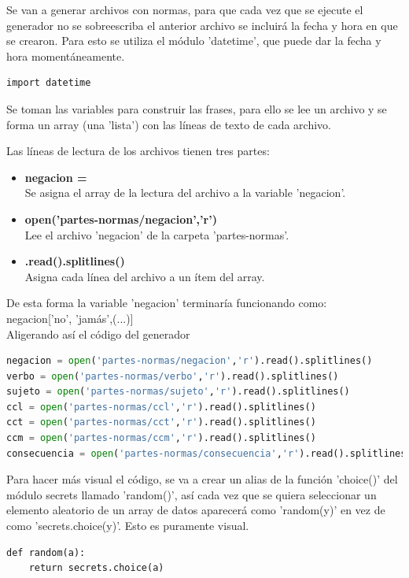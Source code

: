 \documentclass[12pt,twocolumn]{article}
\begin{document}
Se van a generar archivos con normas, para que cada vez que se ejecute el generador
no se sobreescriba el anterior archivo se incluirá la fecha y hora en que se crearon.
Para esto se utiliza el módulo 'datetime', que puede dar la fecha y hora momentáneamente.
\begin{lstlisting}[texcl=true]
import datetime
\end{lstlisting}

Se toman las variables para construir las frases, para ello se lee un archivo y
se forma un array (una 'lista') con las líneas de texto de cada archivo.

Las líneas de lectura de los archivos tienen tres partes:
	\begin{itemize}
	\setlength\itemsep{-0.3em}
    \item \textbf{negacion =} \\
    Se asigna el array de la lectura del archivo a la variable 'negacion'.
    \item \textbf{open('partes-normas/negacion','r')} \\
    Lee el archivo 'negacion' de la carpeta 'partes-normas'.
    \item \textbf{.read().splitlines()} \\
    Asigna cada línea del archivo a un ítem del array.
	\end{itemize}
De esta forma la variable 'negacion' terminaría funcionando como:\\


negacion['no', 'jamás',(...)]\\


	
Aligerando así el código del generador

\begin{lstlisting}[language=python]
negacion = open('partes-normas/negacion','r').read().splitlines()
verbo = open('partes-normas/verbo','r').read().splitlines()
sujeto = open('partes-normas/sujeto','r').read().splitlines()
ccl = open('partes-normas/ccl','r').read().splitlines()
cct = open('partes-normas/cct','r').read().splitlines()
ccm = open('partes-normas/ccm','r').read().splitlines()
consecuencia = open('partes-normas/consecuencia','r').read().splitlines()
\end{lstlisting}

Para hacer más visual el código, se va a crear un alias de la función 'choice()'
del módulo secrets llamado 'random()', así cada vez que se quiera seleccionar un
elemento aleatorio de un array de datos aparecerá como 'random(y)' en vez de como
'secrets.choice(y)'. Esto es puramente visual.
\begin{lstlisting}[texcl=true]
def random(a):
    return secrets.choice(a)
\end{lstlisting}
\end{document}
